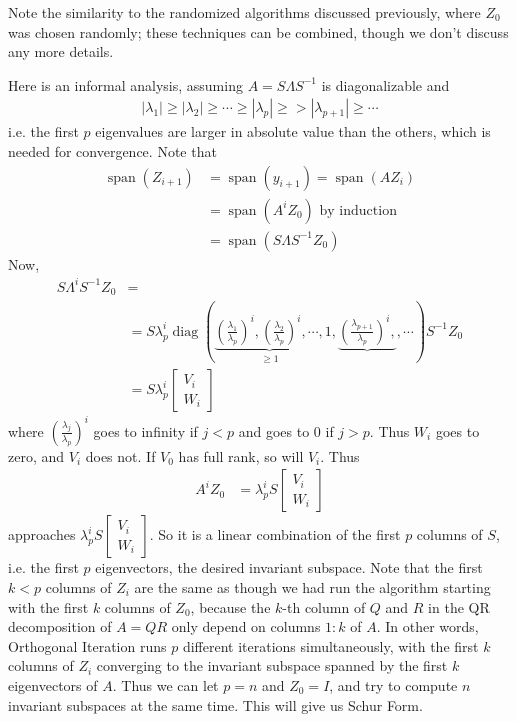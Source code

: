 \documentclass[11pt]{article}
\numberwithin{equation}{section}
\begin{document}
Note the similarity to the randomized algorithms discussed previously, where $Z_0$ was chosen randomly; these techniques can be combined, 
though we don't discuss any more details.

Here is an informal analysis, assuming $A = S\Lambda S^{-1}$ is diagonalizable and \begin{align*}
    \left|\lambda_{1}\right| \geq \left|\lambda_{2}\right| \geq \cdots \geq \left|\lambda_{p}\right| \geq > \left|\lambda_{p+1}\right| \geq \cdots
\end{align*}
i.e. the first $p$ eigenvalues are larger in absolute value than the others, which is needed for convergence. Note that \begin{align*}
    \operatorname{span}(Z_{i+1}) &= \operatorname{span}(y_{i+1}) = \operatorname{span}(AZ_{i}) \\
    &= \operatorname{span}(A^i Z_{0}) \text{ by induction} \\
    &= \operatorname{span}(S\Lambda S^{-1}Z_{0}) 
\end{align*}
Now, \begin{align*}
    S \Lambda^i  S^{-1} Z_0 &= \\
    &= S \lambda_p^i \operatorname{diag}\left( \underbrace{ \left( \frac{\lambda_1}{\lambda_p} \right)^i, \left( \frac{\lambda_2}{\lambda_p} \right)^i, \cdots, }_{\geq 1} 1, \underbrace{\left( \frac{\lambda_{p+1}}{\lambda_p} \right)^i,}, \cdots \right)S^{-1}Z_0 \\
    &= S \lambda_p^i \left[\begin{array}{c}
        V_{i} \\
        W_{i}
        \end{array}\right]
\end{align*}
where $\left( \frac{\lambda_j}{\lambda_p} \right)^i$ goes to infinity if $j < p$ and goes to 0 if $j > p$.
Thus $W_i$ goes to zero, and $V_i$ does not. If $V_0$ has full rank, so will $V_i$. Thus \begin{align*}
    A^i Z_0 &= \lambda_p^i S \left[\begin{array}{l}
        V_i \\
        W_i
        \end{array}\right]
\end{align*}
approaches $\lambda_p^i S \left[\begin{array}{l}
    V_i \\
    W_i
    \end{array}\right]$.
So it is a linear combination of the first $p$ columns of $S$, i.e. the first $p$ eigenvectors, the desired invariant subspace. 
Note that the first $k < p$ columns of $Z_i$ are the same as though we had run the algorithm starting with the first $k$ columns of $Z_0$, 
because the $k$-th column of $Q$ and $R$ in the QR decomposition of $A=QR$ only depend on columns $1:k$ of $A$.
In other words, Orthogonal Iteration runs $p$ different iterations simultaneously, with the first $k$ columns of $Z_i$ converging to the invariant subspace spanned by the first $k$ eigenvectors of $A$.
Thus we can let $p = n$ and $Z_0 = I$, and try to compute $n$ invariant subspaces at the same time. This will give us Schur Form.
\end{document}
